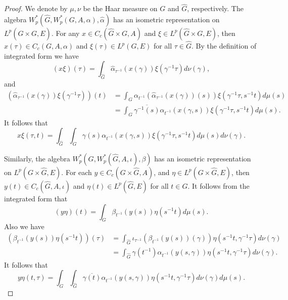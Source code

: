 \documentclass[reqno,11pt]{amsart}
\theoremstyle{plain}
\theoremstyle{definition}
\theoremstyle{remark}
\begin{document}
\begin{proof}
We denote by $\mu,\nu$ be the Haar measure on $G$ and $\hat{G}$, respectively.
The algebra $W^*_p(\hat{G},W^*_p(G,A,\alpha),\hat{\alpha})$ has an isometric representation on $L^p(\hat{G}\times G,E)$.
For any $x\in C_c(\hat{G}\times G,A)$ and $\xi\in L^p(\hat{G}\times G,E)$, then $x(\tau)\in C_c(G,A,\alpha)$ and $\xi(\tau)\in L^p(G,E)$ for all $\tau\in\hat{G}$.
By the definition of integrated form we have
 $$(x\xi)(\tau)=\int_{\hat{G}}\hat{\alpha}_{\tau^{-1}}\left(x(\gamma)\right)\xi(\gamma^{-1}\tau)d\nu(\gamma),$$
and $$\begin{aligned} \left(\hat{\alpha}_{\tau^{-1}}\left(x(\gamma)\right)\xi(\gamma^{-1}\tau)\right)(t)&=
\int_G \alpha_{t^{-1}}\left(\hat{\alpha}_{\tau^{-1}}\left(x(\gamma)\right)(s)\right)\xi(\gamma^{-1}\tau,s^{-1}t)d\mu(s)
  \\ &=\int_G \overline{\gamma^{-1}(s)}\alpha_{t^{-1}}\left(x(\gamma,s)\right)\xi(\gamma^{-1}\tau,s^{-1}t)d\mu(s).\end{aligned}$$
It follows that $$x\xi(\tau,t)=\int_{\hat{G}}\int_G \gamma(s)\alpha_{t^{-1}}\left(x(\gamma,s)\right)\xi(\gamma^{-1}\tau,s^{-1}t)d\mu(s)d\nu(\gamma).$$

Similarly, the algebra $W^*_p(G,W^*_p(\hat{G},A,\iota),\beta)$ has an isometric representation on $L^p(G\times\hat{G},E)$.
For each $y\in C_c(G\times \hat{G},A)$, and $\eta\in L^p(G\times\hat{G},E)$, then $y(t)\in C_c(\hat{G},A,\iota)$ and $\eta(t)\in L^p(\hat{G},E)$ for all $t\in G$. It follows from the integrated form that $$(y\eta)(t)=\int_G \beta_{t^{-1}}\left(y(s)\right)\eta(s^{-1}t)d\mu(s).$$
Also we have
$$\begin{aligned} \left(\beta_{t^{-1}}\left(y(s)\right)\eta(s^{-1}t)\right)(\tau)&=
\int_{\hat{G}} \iota_{\tau^{-1}}\left(\beta_{t^{-1}}(y(s))(\gamma)\right)\eta(s^{-1}t,\gamma^{-1}\tau)d\nu(\gamma)
  \\ &=\int_{\hat{G}} \gamma(t^{-1})\alpha_{t^{-1}}\left(y(s,\gamma)\right)\eta(s^{-1}t,\gamma^{-1}\tau)d\nu(\gamma).\end{aligned}$$
It follows that $$y\eta(t,\tau)=\int_G\int_{\hat{G}}\overline{\gamma(t)}\alpha_{t^{-1}}\left(y(s,\gamma)\right)\eta(s^{-1}t,\gamma^{-1}\tau)d\nu(\gamma)d\mu(s).$$


\end{proof}
\end{document}
